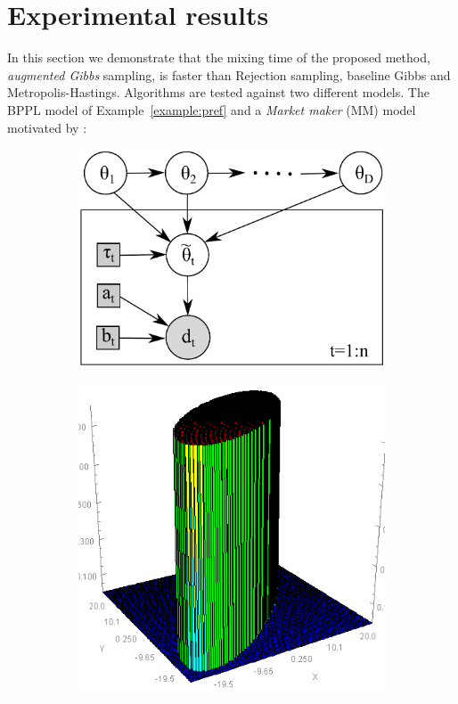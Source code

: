 \section{Experimental results}
\label{sect:experiment}

In this section we demonstrate that the mixing time of the proposed method, 
\emph{augmented Gibbs} sampling, is faster than Rejection sampling, baseline 
Gibbs and Metropolis-Hastings.     
Algorithms are tested against two different models. The BPPL model of Example~\ref{example:pref} and a \emph{Market maker} (MM) model motivated by \cite{Das:08}:

\begin{figure}
\centering
\begin{subfigure}{.35\textwidth}
\centering
\includegraphics[width=.90\textwidth]{pic/market4w.pdf}
\caption{}%
\label{fig:market}
\end{subfigure}
\begin{subfigure}{.24\textwidth}%
  \centering
  \includegraphics[width=.82\textwidth]{pic/elipsePrior.png}

\end{subfigure}
\end{figure}
